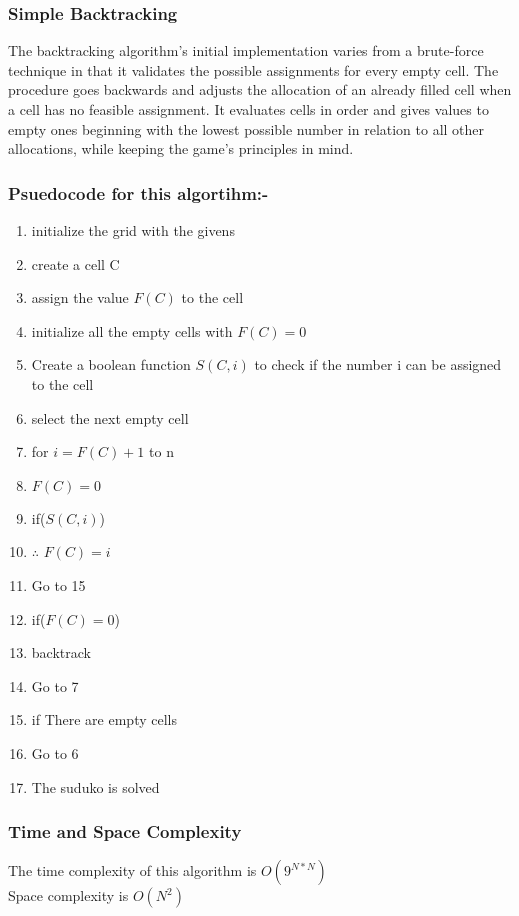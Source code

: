 \documentclass[12pt]{extarticle}
\theoremstyle{plain}
\begin{document}
\subsubsection*{Simple Backtracking}
The backtracking algorithm's initial implementation varies from a brute-force technique in that it validates the possible assignments for every empty cell. The procedure goes backwards and adjusts the allocation of an already filled cell when a cell has no feasible assignment. It evaluates cells in order and gives values to empty ones beginning with the lowest possible number in relation to all other allocations, while keeping the game's principles in mind.
\newline \subsubsection*{Psuedocode for this algortihm:- }
\begin{enumerate}
    \item initialize the grid with the givens
    \item create a cell C
    \item assign the value $F(C)$ to the cell
    \item initialize all the empty cells with $F(C)=0$
    \item Create a boolean function $S(C,i)$ to check if the number i can be assigned to the cell
    \item select the next empty cell
    \item for $i=F(C)+1 $ to n
    \item $F(C)=0$
    \item if($S(C,i)$)
    \item $\therefore$ $F(C)=i$
    \item Go to 15
    \item if($F(C)=0$)
    \item backtrack
    \item Go to 7
    \item if There are empty cells
    \item Go to 6
    \item The suduko is solved
\end{enumerate}

\subsubsection*{Time and Space Complexity}

\noindent The time complexity of this algorithm is $O(9^{N*N})$\\
Space complexity is $O(N^2)$
\end{document}
